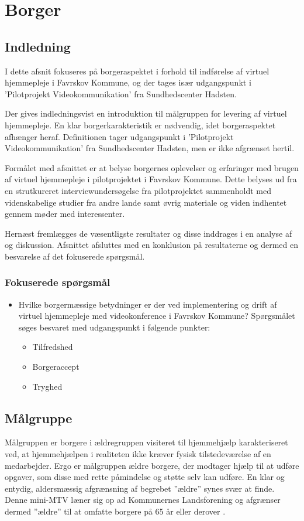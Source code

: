 \chapter{Borger}

\section{Indledning}
I dette afsnit fokuseres på borgeraspektet i forhold til indførelse af virtuel hjemmepleje i Favrskov Kommune, og der tages især udgangspunkt i ’Pilotprojekt Videokommunikation’ fra Sundhedscenter Hadsten. 

Der gives indledningsvist en introduktion til målgruppen for levering af virtuel hjemmepleje. En klar borgerkarakteristik er nødvendig, idet borgeraspektet afhænger heraf. Definitionen tager udgangspunkt i ’Pilotprojekt Videokommunikation’ fra Sundhedscenter Hadsten, men er ikke afgrænset hertil. 

Formålet med afsnittet er at belyse borgernes oplevelser og erfaringer med brugen af virtuel hjemmepleje i pilotprojektet i Favrskov Kommune. Dette belyses ud fra en strutkureret interviewundersøgelse fra pilotprojektet sammenholdt med videnskabelige studier fra andre lande samt øvrig materiale og viden indhentet gennem møder med interessenter.

Hernæst fremlægges de væsentligste resultater og disse inddrages i en analyse af og diskussion. Afsnittet afsluttes med en konklusion på resultaterne og dermed en besvarelse af det fokuserede spørgsmål.



\subsection{Fokuserede spørgsmål}
\begin{itemize}
	\item Hvilke borgermæssige betydninger er der ved implementering og drift af virtuel hjemmepleje med videokonference i Favrskov Kommune? Spørgsmålet søges besvaret med udgangspunkt i følgende punkter:
	\begin{itemize}
	\item Tilfredshed
	\item Borgeraccept
	\item Tryghed
\end{itemize}
\end{itemize}

\section{Målgruppe}
Målgruppen er borgere i ældregruppen visiteret til hjemmehjælp karakteriseret ved, at hjemmehjælpen i realiteten ikke kræver fysisk tilstedeværelse af en medarbejder. Ergo er målgruppen ældre borgere, der modtager hjælp til at udføre opgaver, som disse med rette påmindelse og støtte selv kan udføre. En klar og entydig, aldersmæssig afgrænsning af begrebet ”ældre” synes svær at finde. Denne mini-MTV læner sig op ad Kommunernes Landsforening og afgrænser dermed ”ældre” til at omfatte borgere på 65 år eller derover \cite{KL}. 

